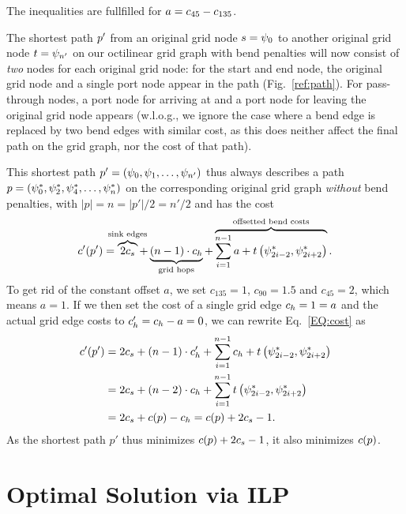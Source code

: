 \documentclass[sigconf]{acmart}
\begin{document}
The inequalities are fullfilled for $a = c_{45} - c_{135}$.

The shortest path $p'$ from an original grid node $s = \psi_0$ to another original grid node $t=\psi_{n'}$ on our octilinear grid graph with bend penalties will now consist of \emph{two} nodes for each original grid node: for the start and end node, the original grid node and a single port node appear in the path (Fig.~\ref{ref:path}).
For pass-through nodes, a port node for arriving at and a port node for leaving the original grid node appears (w.l.o.g., we ignore the case where a bend edge is replaced by two bend edges with similar cost, as this does neither affect the final path on the grid graph, nor the cost of that path).

This shortest path $p' = (\psi_0, \psi_1, \dots, \psi_{n'})$ thus always describes a path $p = (\psi^*_0, \psi^*_2, \psi^*_4, \dots, \psi^*_{n})$ on the corresponding original grid graph \emph{without} bend penalties, with $|p| = n = |p'| / 2 = n' / 2$ and has the cost
%
\begin{align}
	\gPcostOcti{\gPathOcti} = \overbrace{2 \gSinkcost}^{\makebox[0pt]{$\scriptstyle{\text{sink edges}}$}} + \underbrace{\left(n - 1\right) \cdot \gHopcost}_{\makebox[0pt]{$\scriptstyle{\text{grid hops}}$}} + \overbrace{\sum_{i=1}^{n - 1} a + t\left(\gv^*_{2i - 2}, \gv^*_{2i+2}\right)}^{\makebox[0pt]{$\scriptstyle{\text{offsetted bend costs}}$}}\label{EQ:cost}.
\end{align}
%
To get rid of the constant offset $a$, we set $c_{135} = 1$, $c_{90} = 1.5$ and $c_{45} = 2$, which means $a = 1$.
If we then set the cost of a single grid edge $c_h = 1 = a$ and the actual grid edge costs to $c'_h = c_h - a = 0$, we can rewrite Eq.~\ref{EQ:cost} as  
%
\begin{align}
	c'(p') &= 2 c_s +  \left(n - 1\right) \cdot c'_h + \sum_{i=1}^{n - 1} c_h + t\left(\psi^*_{2i - 2}, \psi^*_{2i+2}\right) \\
	     &= 2 c_s + \left(n - 2\right) \cdot c_h + \sum_{i=1}^{n - 1} t \left(\psi^*_{2i - 2}, \psi^*_{2i+2}\right) \\
	     &= 2 c_s + c(p) - c_h = c(p) + 2 c_s - 1.
\end{align}
%
As the shortest path $p'$ thus minimizes $c(p) + 2 c_s - 1$, it also minimizes $c(p)$.

\section{Optimal Solution via ILP}
\end{document}
